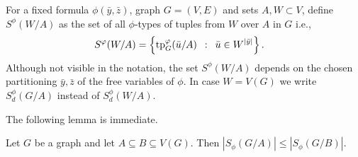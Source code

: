 For a fixed formula $\phi(\bar y,\bar z)$,  graph $G=(V,E)$ and sets $A,W\subset V$, define
 $S^\phi(W/A)$ as the set of all $\phi$-types of tuples from $W$ over $A$ in $G$
i.e., \begin{align*}
S^\varphi(W/A)&=\left\{\mathrm{tp}^\varphi_G(\bar u/A) \,~:~\, \bar u\in W^{|\bar y|} \right\}.
\end{align*}
Although not visible in the notation, the set $S^\phi(W/A)$ depends on the chosen partitioning $\bar y,\bar z$ of the free variables of $\phi$.
In case $W=V(G)$ we write $S^{\phi}_d(G/A)$ instead of 
$S^{\phi}_d(W/A)$.

The following lemma is immediate.
\begin{lemma}\label{lem:types-over-B}
Let $G$ be a graph and let $A\subseteq B\subseteq V(G)$. Then 
$|S_\phi(G/A)|\leq |S_\phi(G/B)|$. 
\end{lemma}






